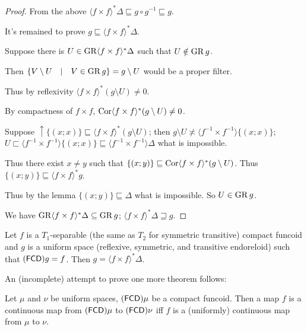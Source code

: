 \begin{proof}
From the above $\langle f \times f \rangle^{\ast} \Delta \sqsubseteq g \circ
g^{- 1} \sqsubseteq g$. 

It's remained to prove $g \sqsubseteq \langle f \times f \rangle^{\ast}
\Delta$.


Suppose there is $U \in \operatorname{GR} \langle f \times f \rangle^{\ast} \Delta$
such that $U \notin \operatorname{GR} g$.

Then $\left\{ V \setminus U \hspace{1em} | \hspace{1em} V \in \operatorname{GR} g
\right\} = g \setminus U$ would be a proper filter.

Thus by reflexivity $\langle f \times f \rangle^{\ast} (g \setminus U) \neq
0$.

By compactness of $f \times f$, $\operatorname{Cor} \langle f \times f \rangle^{\ast}
(g \setminus U) \neq 0$.

Suppose $\uparrow \{ (x ; x) \} \sqsubseteq \langle f \times f \rangle^{\ast}
(g \setminus U)$; then $g \setminus U \nasymp \langle f^{- 1} \times f^{- 1}
\rangle \{ (x ; x) \}$; $U \sqsubset \langle f^{- 1} \times f^{- 1} \rangle \{
(x ; x) \} \sqsubseteq \langle f^{- 1} \times f^{- 1} \rangle \Delta$ what is
impossible.

Thus there exist $x \neq y$ such that $\{ (x ; y) \} \sqsubseteq \operatorname{Cor}
\langle f \times f \rangle^{\ast} (g \setminus U)$. Thus $\{ (x ; y) \}
\sqsubseteq \langle f \times f \rangle^{\ast} g$.

Thus by the lemma $\{ (x ; y) \} \sqsubseteq \Delta$ what is impossible. So $U
\in \operatorname{GR} g$.

We have $\operatorname{GR} \langle f \times f \rangle^{\ast} \Delta \subseteq
\operatorname{GR} g$; $\langle f \times f \rangle^{\ast} \Delta \sqsupseteq g$.
\end{proof}

\begin{cor}
  Let $f$ is a $T_1$-separable (the same as $T_2$ for symmetric transitive)
  compact funcoid and $g$ is a uniform space (reflexive, symmetric, and
  transitive endoreloid) such that $(\mathsf{FCD}) g = f$. Then $g =
  \langle f \times f \rangle^{\ast} \Delta$.
\end{cor}

An (incomplete) attempt to prove one more theorem follows:

\begin{thm}
  Let $\mu$ and $\nu$ be uniform spaces, $(\mathsf{FCD})
  \mu$ be a compact funcoid. Then a map $f$ is a continuous map from
  $(\mathsf{FCD}) \mu$ to $(\mathsf{FCD}) \nu$ iff $f$ is
  a (uniformly) continuous map from $\mu$ to $\nu$.
\end{thm}

